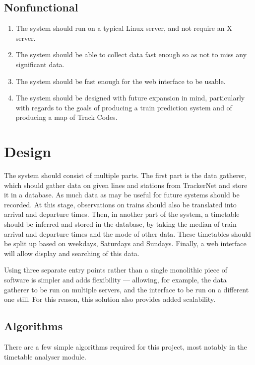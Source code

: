 \documentclass[a4paper,12pt,twoside]{report}
\begin{document}
\section{Nonfunctional}

\begin{enumerate}
  \item The system should run on a typical Linux server, and not require an X
    server.
  \item The system should be able to collect data fast enough so as not to miss
    any significant data.
  \item The system should be fast enough for the web interface to be usable.
  \item The system should be designed with future expansion in mind,
    particularly with regards to the goals of producing a train prediction
    system and of producing a map of Track Codes.
\end{enumerate}

\chapter{Design}

The system should consist of multiple parts. The first part is the data
gatherer, which should gather data on given lines and stations from TrackerNet
and store it in a database. As much data as may be useful for future systems
should be recorded. At this stage, observations on trains should also be
translated into arrival and departure times. Then, in another part of the
system, a timetable should be inferred and stored in the database, by taking
the median of train arrival and departure times and the mode of other data.
These timetables should be split up based on weekdays, Saturdays and Sundays.
Finally, a web interface will allow display and searching of this data.

Using three separate entry points rather than a single monolithic piece of
software is simpler and adds flexibility --- allowing, for example, the data
gatherer to be run on multiple servers, and the interface to be run on a
different one still. For this reason, this solution also provides added
scalability.

\section{Algorithms}

There are a few simple algorithms required for this project, most notably in
the timetable analyser module.
\end{document}
